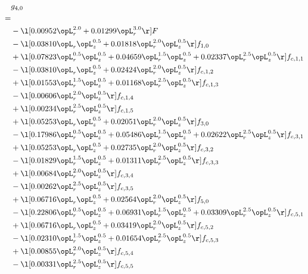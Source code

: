 \begin{alignat}{2} 
\label{eq:g_40_0} 
& g_{4,0} \nonumber \\ 
 = \\ 
& - \l[  0.00952 \opL_r^{2.0} +  0.01299 \opL_r^{3.0}  \r] F \nonumber \\ 
& - \l[  0.03810 \opL_r \opL_z^{0.5} +  0.01818 \opL_r^{2.0} \opL_z^{0.5}  \r] f_{1,0} \nonumber \\ 
& + \l[  0.07823 \opL_r^{0.5} \opL_z^{0.5} +  0.04659 \opL_r^{1.5} \opL_z^{0.5} +  0.02337 \opL_r^{2.5} \opL_z^{0.5}  \r] f_{c,1,1} \nonumber \\ 
& - \l[  0.03810 \opL_r \opL_z^{0.5} +  0.02424 \opL_r^{2.0} \opL_z^{0.5}  \r] f_{c,1,2} \nonumber \\ 
& + \l[  0.01553 \opL_r^{1.5} \opL_z^{0.5} +  0.01168 \opL_r^{2.5} \opL_z^{0.5}  \r] f_{c,1,3} \nonumber \\ 
& - \l[  0.00606 \opL_r^{2.0} \opL_z^{0.5}  \r] f_{c,1,4} \nonumber \\ 
& + \l[  0.00234 \opL_r^{2.5} \opL_z^{0.5}  \r] f_{c,1,5} \nonumber \\ 
& + \l[  0.05253 \opL_r \opL_z^{0.5} +  0.02051 \opL_r^{2.0} \opL_z^{0.5}  \r] f_{3,0} \nonumber \\ 
& - \l[  0.17986 \opL_r^{0.5} \opL_z^{0.5} +  0.05486 \opL_r^{1.5} \opL_z^{0.5} +  0.02622 \opL_r^{2.5} \opL_z^{0.5}  \r] f_{c,3,1} \nonumber \\ 
& + \l[  0.05253 \opL_r \opL_z^{0.5} +  0.02735 \opL_r^{2.0} \opL_z^{0.5}  \r] f_{c,3,2} \nonumber \\ 
& - \l[  0.01829 \opL_r^{1.5} \opL_z^{0.5} +  0.01311 \opL_r^{2.5} \opL_z^{0.5}  \r] f_{c,3,3} \nonumber \\ 
& + \l[  0.00684 \opL_r^{2.0} \opL_z^{0.5}  \r] f_{c,3,4} \nonumber \\ 
& - \l[  0.00262 \opL_r^{2.5} \opL_z^{0.5}  \r] f_{c,3,5} \nonumber \\ 
& + \l[  0.06716 \opL_r \opL_z^{0.5} +  0.02564 \opL_r^{2.0} \opL_z^{0.5}  \r] f_{5,0} \nonumber \\ 
& - \l[  0.22806 \opL_r^{0.5} \opL_z^{0.5} +  0.06931 \opL_r^{1.5} \opL_z^{0.5} +  0.03309 \opL_r^{2.5} \opL_z^{0.5}  \r] f_{c,5,1} \nonumber \\ 
& + \l[  0.06716 \opL_r \opL_z^{0.5} +  0.03419 \opL_r^{2.0} \opL_z^{0.5}  \r] f_{c,5,2} \nonumber \\ 
& - \l[  0.02310 \opL_r^{1.5} \opL_z^{0.5} +  0.01654 \opL_r^{2.5} \opL_z^{0.5}  \r] f_{c,5,3} \nonumber \\ 
& + \l[  0.00855 \opL_r^{2.0} \opL_z^{0.5}  \r] f_{c,5,4} \nonumber \\ 
& - \l[  0.00331 \opL_r^{2.5} \opL_z^{0.5}  \r] f_{c,5,5} \nonumber \\ 
\end{alignat} 


